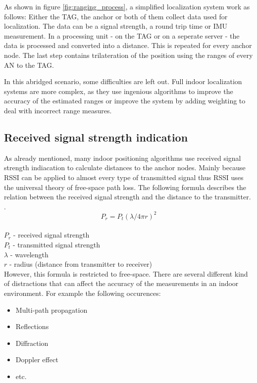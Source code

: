 As shown in figure \ref{fig:ranging_process}, a simplified localization system work as follows:
Either the TAG, the anchor or both of them collect data used for localization. The data can be a signal strength, a round trip time or IMU measurement.
In a processing unit - on the TAG or on a seperate server - the data is processed and converted into a distance. This is repeated for every anchor node.
The last step contains trilateration of the position using the ranges of every AN to the TAG.

In this abridged scenario, some difficulties are left out. Full indoor localization systems are more complex, as they use ingenious algorithms to improve the accuracy of the estimated ranges or improve the system by adding weighting to deal with incorrect range measures.

\subsection{Received signal strength indication}
As already mentioned, many indoor positioning algorithms use received signal strength indiacation to calculate distances to the anchor nodes. Mainly because RSSI can be applied to almost every type of transmitted signal thus RSSI uses the universal theory of free-space path loss. The following formula describes the relation between the received signal strength and the distance to the transmitter. \cite{VorlesungCN}.
$$
P_{r} = P_{t} (\lambda/4\pi r)^2
$$
\\
$P_{r}$ - received signal strength\\
$P_{t}$ - transmitted signal strength\\
$\lambda$ - wavelength\\
$r$ - radius (distance from transmitter to receiver)\\

However, this formula is restricted to free-space. There are several different kind of distractions that can affect the accuracy of the measurements in an indoor environment. For example the following occurences:
\begin{itemize} 
\item Multi-path propagation
\item Reflections
\item Diffraction
\item Doppler effect
\item etc.
\end{itemize}

